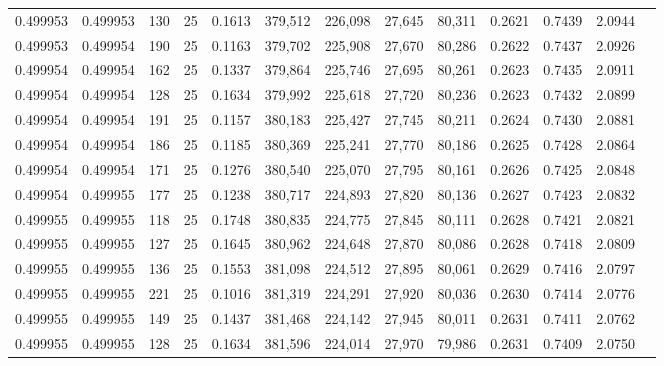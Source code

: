 \begin{tabular}{rrrrrrrrrrrrr}
0.499953 & 0.499953 &   130 &  25 &                                     0.1613 & 379,512 & 226,098 &  27,645 &  80,311 & 0.2621 & 0.7439 & 2.0944 \\
0.499953 & 0.499954 &   190 &  25 &                                     0.1163 & 379,702 & 225,908 &  27,670 &  80,286 & 0.2622 & 0.7437 & 2.0926 \\
0.499954 & 0.499954 &   162 &  25 &                                     0.1337 & 379,864 & 225,746 &  27,695 &  80,261 & 0.2623 & 0.7435 & 2.0911 \\
0.499954 & 0.499954 &   128 &  25 &                                     0.1634 & 379,992 & 225,618 &  27,720 &  80,236 & 0.2623 & 0.7432 & 2.0899 \\
0.499954 & 0.499954 &   191 &  25 &                                     0.1157 & 380,183 & 225,427 &  27,745 &  80,211 & 0.2624 & 0.7430 & 2.0881 \\
0.499954 & 0.499954 &   186 &  25 &                                     0.1185 & 380,369 & 225,241 &  27,770 &  80,186 & 0.2625 & 0.7428 & 2.0864 \\
0.499954 & 0.499954 &   171 &  25 &                                     0.1276 & 380,540 & 225,070 &  27,795 &  80,161 & 0.2626 & 0.7425 & 2.0848 \\
0.499954 & 0.499955 &   177 &  25 &                                     0.1238 & 380,717 & 224,893 &  27,820 &  80,136 & 0.2627 & 0.7423 & 2.0832 \\
0.499955 & 0.499955 &   118 &  25 &                                     0.1748 & 380,835 & 224,775 &  27,845 &  80,111 & 0.2628 & 0.7421 & 2.0821 \\
0.499955 & 0.499955 &   127 &  25 &                                     0.1645 & 380,962 & 224,648 &  27,870 &  80,086 & 0.2628 & 0.7418 & 2.0809 \\
0.499955 & 0.499955 &   136 &  25 &                                     0.1553 & 381,098 & 224,512 &  27,895 &  80,061 & 0.2629 & 0.7416 & 2.0797 \\
0.499955 & 0.499955 &   221 &  25 &                                     0.1016 & 381,319 & 224,291 &  27,920 &  80,036 & 0.2630 & 0.7414 & 2.0776 \\
0.499955 & 0.499955 &   149 &  25 &                                     0.1437 & 381,468 & 224,142 &  27,945 &  80,011 & 0.2631 & 0.7411 & 2.0762 \\
0.499955 & 0.499955 &   128 &  25 &                                     0.1634 & 381,596 & 224,014 &  27,970 &  79,986 & 0.2631 & 0.7409 & 2.0750 \\

\end{tabular}
